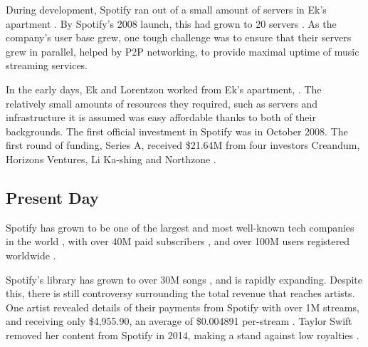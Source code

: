 
During development, Spotify ran out of a small amount of servers in Ek's apartment \parencite{JordanCrook2015}. By Spotify's 2008 launch, this had grown to 20 servers \parencite{Garcia2013}. As the company's user base grew, one tough challenge was to ensure that their servers grew in parallel, helped by P2P networking, to provide maximal uptime of music streaming services.


In the early days, Ek and Lorentzon worked from Ek's apartment, \parencite{JordanCrook2015}. The relatively small amounts of resources they required, such as servers and infrastructure it is assumed was easy affordable thanks to both of their backgrounds. The first official investment in Spotify was in October 2008. The first round of funding, Series A, received \$21.64M from four investors Creandum, Horizons Ventures, Li Ka-shing and Northzone \parencite{Broeders2016}. 

\subsection{Present Day}

Spotify has grown to be one of the largest and most well-known tech companies in the world \parencite{Nusca2016}, with over 40M paid subscribers \parencite{40m_spotify}, and over 100M users registered worldwide \parencite{Glenday2016}.


Spotify's library has grown to over 30M songs \parencite{Spotify2016b}, and is rapidly expanding. Despite this, there is still controversy surrounding the total revenue that reaches artists. One artist revealed details of their payments from Spotify with over 1M streams, and receiving only \$4,955.90, an average of \$0.004891 per-stream \parencite{Resnikoff2016}. Taylor Swift removed her content from Spotify in 2014, making a stand against low royalties \parencite{Ellis-Petersen2014}. 

